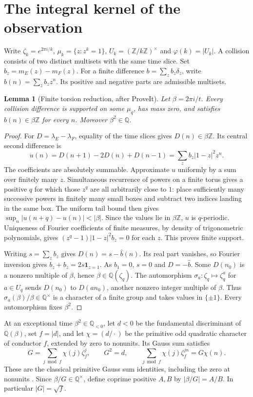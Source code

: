 \documentclass[11pt,letterpaper]{article}
\newtheorem{lemma}[theorem]{Lemma}
\newcommand{\Z}{\mathbb Z}
\newcommand{\Q}{\mathbb Q}
\newcommand{\one}{\mathbf 1}
\begin{document}
\section{The integral kernel of the observation}

Write $\zeta_k=e^{2\pi i/k}$, $\mu_k=\{z:z^k=1\}$, $U_k=(\Z/k\Z)^\times$ and $\varphi(k)=|U_k|$. A collision consists of two distinct multisets with the same time slice. Set $b_z=m_E(z)-m_F(z)$. For a finite difference $b=\sum_z b_z\delta_z$, write $\widehat b(n)=\sum_z b_zz^n$. Its positive and negative parts are admissible multisets.

\begin{lemma}[Finite torsion reduction, after ProveIt]\label{lem:torsion}
Let $\beta=2\pi i/t$. Every collision difference is supported on some $\mu_q$, has mass zero, and satisfies $\widehat b(n)\in\beta\Z$ for every $n$. Moreover $\beta^2\in\Q$.
\end{lemma}
\begin{proof}
For $D=\lambda_E-\lambda_F$, equality of the time slices gives $D(n)\in\beta\Z$. Its central second difference is
\[
 u(n)=D(n+1)-2D(n)+D(n-1)=\sum_z b_z|1-z|^2z^n.
\]
The coefficients are absolutely summable. Approximate $u$ uniformly by a sum over finitely many $z$. Simultaneous recurrence of powers on a finite torus gives a positive $q$ for which those $z^q$ are all arbitrarily close to $1$: place sufficiently many successive powers in finitely many small boxes and subtract two indices landing in the same box. The uniform tail bound then gives $\sup_n|u(n+q)-u(n)|<|\beta|$. Since the values lie in $\beta\Z$, $u$ is $q$-periodic. Uniqueness of Fourier coefficients of finite measures, by density of trigonometric polynomials, gives $(z^q-1)|1-z|^2b_z=0$ for each $z$. This proves finite support.

Writing $s=\sum_z b_z$ gives $D(n)=s-\widehat b(n)$. Its real part vanishes, so Fourier inversion gives $b_z+b_{\bar z}=2s\one_{z=1}$. As $b_1=0$, $s=0$ and $D=-\widehat b$. Some $D(n_0)$ is a nonzero multiple of $\beta$, hence $\beta\in\Q(\zeta_q)$. The automorphism $\sigma_a:\zeta_q\mapsto\zeta_q^a$ for $a\in U_q$ sends $D(n_0)$ to $D(an_0)$, another nonzero integer multiple of $\beta$. Thus $\sigma_a(\beta)/\beta\in\Q^\times$ is a character of a finite group and takes values in $\{\pm1\}$. Every automorphism fixes $\beta^2$.
\end{proof}

At an exceptional time $\beta^2\in\Q_{<0}$, let $d<0$ be the fundamental discriminant of $\Q(\beta)$, set $f=|d|$, and let $\chi=(d/\cdot)$ be the primitive odd quadratic character of conductor $f$, extended by zero to nonunits. Its Gauss sum satisfies
\[
 G=\sum_{j\bmod f}\chi(j)\zeta_f^j,\qquad
 G^2=d,\qquad \sum_{j\bmod f}\chi(j)\zeta_f^{jn}=G\chi(n).
\]
These are the classical primitive Gauss sum identities, including the zero at nonunits \cite{davenport}. Since $\beta/G\in\Q^\times$, define coprime positive $A,B$ by $|\beta/G|=A/B$. In particular $|G|=\sqrt f$.
\end{document}
